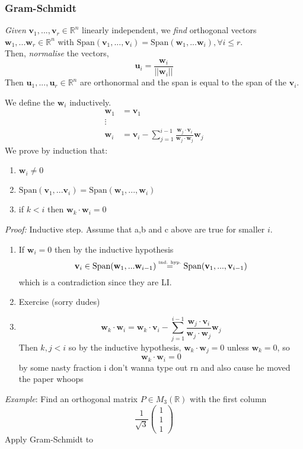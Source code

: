 \documentclass{report}
\theoremstyle{remark}
\theoremstyle{definition}
\theoremstyle{definition}
\theoremstyle{theorem}
\renewcommand{\v}[1]{\mathbf{#1}}
\providecommand{\vectiii}[3]{\begin{pmatrix}#1\\#2\\#3\end{pmatrix}}
\begin{document}
\subsubsection{Gram-Schmidt}
\emph{Given} $\v{v}_1,...,\v{v}_r \in \mathbb{R}^n$ linearly independent, we \emph{find} orthogonal vectors $\v{w}_1,...\v{w}_r \in \mathbb{R}^n$ with $\mathrm{Span}(\v{v}_1,...,\v{v}_i) = \mathrm{Span}(\v{w}_1,...\v{w}_i), \forall i \leq r$.\\
Then, \emph{normalise} the vectors,
\[\v{u}_i=\frac{\v{w}_i}{||\v{w}_i||}\]
Then $\v{u}_1,...,\v{u}_r \in \mathbb{R}^n$ are orthonormal and the span is equal to the span of the $\v{v}_i$.\par
We define the $\v{w}_i$ inductively. 
\begin{align*}
    \v{w}_1&=\v{v}_1\\
    \vdots&\\
    \v{w}_i&=\v{v}_i-\sum_{j=1}^{i-1}\frac{\v{w}_j\cdot \v{v}_i}{\v{w}_j\cdot\v{w}_j}\v{w}_j
\end{align*}
We prove by induction that:
\begin{enumerate}[label=(\alph*)]
    \item $\v{w}_i\neq0$
    \item $\mathrm{Span}(\v{v}_1,...\v{v}_i)=\mathrm{Span}(\v{w}_1,...,\v{w}_i)$
    \item if $k<i$ then $\v{w}_k\cdot \v{w}_i=0$
\end{enumerate}
\emph{Proof:} Inductive step. Assume that a,b and c above are true for smaller $i$.
\begin{enumerate}[label=(\alph*)]
    \item If $\v{w}_i=0$ then by the inductive hypothesis
    \[\v{v}_i \in \mathrm{Span}(\v{w}_1,...\v{w}_{i-1})\overset{\text{\tiny{ind. hyp.}}}{=}\mathrm{Span}(\v{v}_1,...,\v{v}_{i-1})\]
    which is a contradiction since they are LI.
    \item Exercise (sorry dudes)
    \item \[\v{w}_k \cdot \v{w}_i=\v{w}_k\cdot\v{v}_i-\sum_{j=1}^{i-1}\frac{\v{w}_j\cdot \v{v}_i}{\v{w}_j\cdot\v{w}_j}\v{w}_j\]
    Then $k,j < i$ so by the inductive hypothesis, $\v{w}_k\cdot \v{w}_j=0$ unless $\v{w}_k=0$, so
    \[\v{w}_k\cdot\v{w}_i=0\]
    by some nasty fraction i don't wanna type out rn and also cause he moved the paper whoops
\end{enumerate}
\emph{Example}: Find an orthogonal matrix $P \in M_3(\mathbb{R})$ with the first column
\[\frac{1}{\sqrt{3}}\vectiii{1}{1}{1}\]
Apply Gram-Schmidt to
\end{document}
